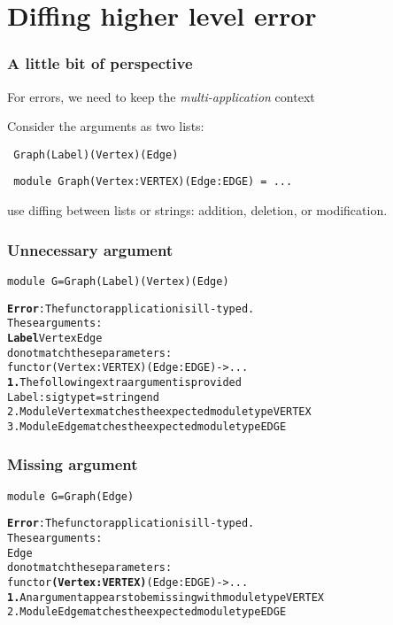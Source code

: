 \documentclass[11pt,aspectratio=169]{beamer}
\begin{document}
\section{Diffing higher level error}


\begin{frame}[fragile]\frametitle{A little bit of perspective}

  For errors, we need to keep the \emph{multi-application} context

Consider the arguments as two lists:
\begin{verbatim}
 Graph(Label)(Vertex)(Edge)
\end{verbatim}
\begin{verbatim}
 module Graph(Vertex:VERTEX)(Edge:EDGE) = ...
\end{verbatim}

use diffing between lists or strings: addition, deletion, or modification.

\end{frame}

\begin{frame}[fragile]\frametitle{Unnecessary argument}
\begin{verbatim}
module G=Graph(Label)(Vertex)(Edge)
\end{verbatim}
\begin{alltt}
{\bfseries{}\color{red}{}Error}: The functor application is ill-typed.
       These arguments:
         {\color{red}{}\bfseries{}Label} {\color{green}{}Vertex} {\color{green}{}Edge}
       do not match these parameters:
         functor {\color{red}{}\bfseries{}} {\color{green}{}(Vertex : VERTEX)} {\color{green}{}(Edge : EDGE)} -> ...
  {\color{red}{}\bfseries{}1.} The following extra argument is provided
      Label : sig type t = string end
  {\color{green}{}2.} Module Vertex matches the expected module type VERTEX
  {\color{green}{}3.} Module Edge matches the expected module type EDGE
\end{alltt}
\end{frame}

\begin{frame}[fragile]\frametitle{Missing argument}
\begin{verbatim}
module G=Graph(Edge)
\end{verbatim}
\begin{alltt}
{\bfseries{}\color{red}{}Error}: The functor application is ill-typed.
       These arguments:
         {\color{red}{}\bfseries{}} {\color{green}{}Edge}
       do not match these parameters:
         functor {\color{red}{}\bfseries{}(Vertex : VERTEX)} {\color{green}{}(Edge : EDGE)} -> ...
  {\color{red}{}\bfseries{}1.} An argument appears to be missing with module type VERTEX
  {\color{green}{}2.} Module Edge matches the expected module type EDGE
\end{alltt}
\end{frame}
\end{document}
